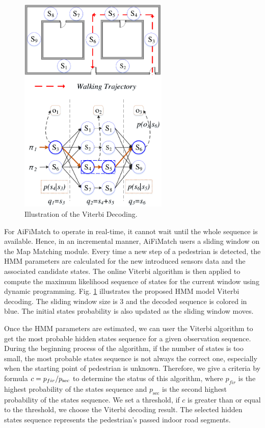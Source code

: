 \documentclass[conference]{IEEEtran}
\begin{document}
\begin{figure}[!htbp]
	\centering
	\includegraphics[width=2.8in]{AiFiMatch-Viterbi}
	\caption{Illustration of the Viterbi Decoding.}
	\label{fig-viterbi}
\end{figure}

For AiFiMatch to operate in real-time, it cannot wait until the whole sequence is available. Hence, in an incremental manner, AiFiMatch users a sliding window on the Map Matching module. Every time a new step of a pedestrian is detected, the HMM parameters are calculated for the new introduced sensors data and the associated candidate states. The online Viterbi algorithm \cite{bloit2008short} is then applied to compute the maximum likelihood sequence of states for the current window using dynamic programming. Fig. \ref{fig-viterbi} illustrates the proposed HMM model Viterbi decoding. The sliding window size is $3$ and the decoded sequence is colored in blue. The initial states probability is also updated as the sliding window moves.

Once the HMM parameters are estimated, we can user the Viterbi algorithm to get the most probable hidden states sequence for a given observation sequence. During the beginning process of the algorithm, if the number of states is too small, the most probable states sequence is not always the correct one, especially when the starting point of pedestrian is unknown. Therefore, we give a criteria by formula $c = {{{p_{fir}}} \mathord{\left/
		{\vphantom {{{p_{fir}}} {{p_{\sec }}}}} \right.
		\kern-\nulldelimiterspace} {{p_{\sec }}}}$ to determine the status of this algorithm, where ${p_{fir}}$ is the highest probability of the states sequence and ${p_{\sec }}$ is the second highest probability of the states sequence. We set a threshold, if $c$ is greater than or equal to the threshold, we choose the Viterbi decoding result. The selected hidden states sequence represents the pedestrian's passed indoor road segments.
\end{document}

